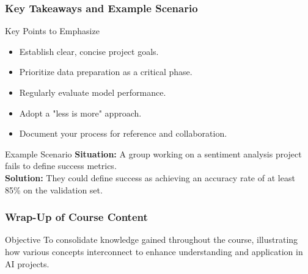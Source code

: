 \documentclass[aspectratio=169]{beamer}
\begin{document}
\begin{frame}[fragile]
    \frametitle{Key Takeaways and Example Scenario}
    \begin{block}{Key Points to Emphasize}
        \begin{itemize}
            \item Establish clear, concise project goals.
            \item Prioritize data preparation as a critical phase.
            \item Regularly evaluate model performance.
            \item Adopt a "less is more" approach.
            \item Document your process for reference and collaboration.
        \end{itemize}
    \end{block}
    
    \begin{block}{Example Scenario}
        \textbf{Situation:} A group working on a sentiment analysis project fails to define success metrics. \\
        \textbf{Solution:} They could define success as achieving an accuracy rate of at least 85\% on the validation set.
    \end{block}
\end{frame}

\begin{frame}[fragile]
    \frametitle{Wrap-Up of Course Content}
    \begin{block}{Objective}
        To consolidate knowledge gained throughout the course, illustrating how various concepts interconnect to enhance understanding and application in AI projects.
    \end{block}
\end{frame}
\end{document}
